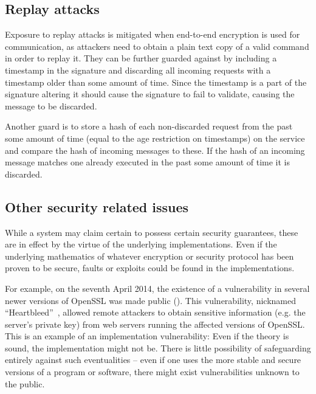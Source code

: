 \subsection{Replay attacks}
Exposure to replay attacks is mitigated when end-to-end encryption is used for communication, as attackers need to obtain a plain text copy of a valid command in order to replay it.
They can be further guarded against by including a timestamp in the signature and discarding all incoming requests with a timestamp older than some amount of time.
Since the timestamp is a part of the signature altering it should cause the signature to fail to validate, causing the message to be discarded.

Another guard is to store a hash of each non-discarded request from the past some amount of time (equal to the age restriction on timestamps) on the service and compare the hash of incoming messages to these.
If the hash of an incoming message matches one already executed in the past some amount of time it is discarded.

\subsection{Other security related issues}
While a system may claim certain to possess certain security guarantees, these are in effect by the virtue of the underlying implementations.
Even if the underlying mathematics of whatever encryption or security protocol has been proven to be secure, faults or exploits could be found in the implementations.

For example, on the seventh April 2014, the existence of a vulnerability in several newer versions of OpenSSL was made public ().
This vulnerability, nicknamed ``Heartbleed''~\citep{heartbleed}, allowed remote attackers to obtain sensitive information (e.g. the server's private key) from web servers running the affected versions of OpenSSL.
This is an example of an implementation vulnerability: Even if the theory is sound, the implementation might not be.
There is little possibility of safeguarding entirely against such eventualities -- even if one uses the more stable and secure versions of a program or software, there might exist vulnerabilities unknown to the public.

